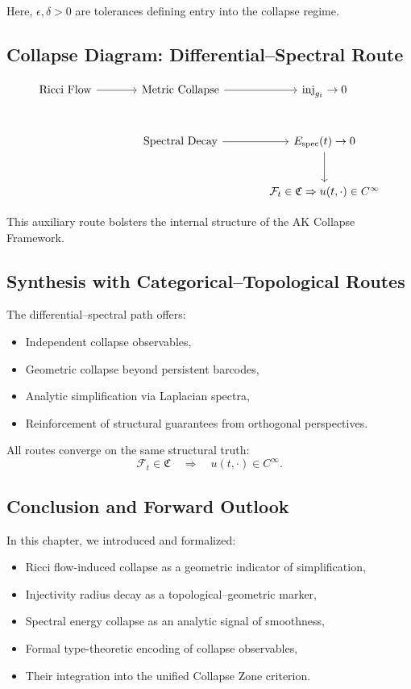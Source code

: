 \documentclass[11pt]{article}
\begin{document}
Here, \( \epsilon, \delta > 0 \) are tolerances defining entry into the collapse regime.

\subsection{Collapse Diagram: Differential–Spectral Route}

\[
\begin{tikzcd}[row sep=large, column sep=large]
\text{Ricci Flow} \arrow[r] & \text{Metric Collapse} \arrow[r] & \mathrm{inj}_{g_t} \to 0 \\
& \text{Spectral Decay} \arrow[r] & E_{\mathrm{spec}}(t) \to 0 \arrow[d] \\
& & \mathcal{F}_t \in \mathfrak{C} \Rightarrow u(t, \cdot) \in C^\infty
\end{tikzcd}
\]

This auxiliary route bolsters the internal structure of the AK Collapse Framework.

\subsection{Synthesis with Categorical–Topological Routes}

The differential–spectral path offers:
\begin{itemize}
  \item Independent collapse observables,
  \item Geometric collapse beyond persistent barcodes,
  \item Analytic simplification via Laplacian spectra,
  \item Reinforcement of structural guarantees from orthogonal perspectives.
\end{itemize}

All routes converge on the same structural truth:
\[
\mathcal{F}_t \in \mathfrak{C} \quad \Longrightarrow \quad u(t, \cdot) \in C^\infty.
\]

\subsection{Conclusion and Forward Outlook}

In this chapter, we introduced and formalized:
\begin{itemize}
  \item Ricci flow-induced collapse as a geometric indicator of simplification,
  \item Injectivity radius decay as a topological–geometric marker,
  \item Spectral energy collapse as an analytic signal of smoothness,
  \item Formal type-theoretic encoding of collapse observables,
  \item Their integration into the unified Collapse Zone criterion.
\end{itemize}
\end{document}
